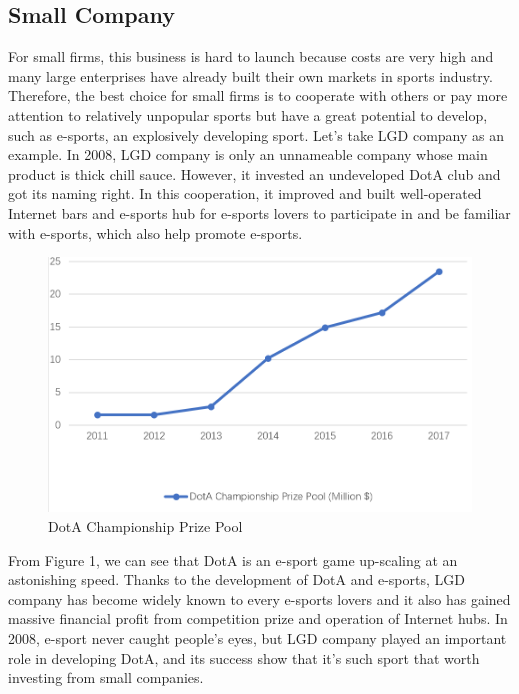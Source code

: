 \documentclass[12pt]{article}
\begin{document}
\subsection{Small Company}
For small firms, this business is hard to launch because costs are very high and many large enterprises have already built their own markets in sports industry. Therefore, the best choice for small firms is to cooperate with others or pay more attention to relatively unpopular sports but have a great potential to develop, such as e-sports, an explosively developing sport. Let's take LGD company as an example. In 2008, LGD company is only an unnameable company whose main product is thick chill sauce. However, it invested an undeveloped DotA club and got its naming right. In this cooperation, it improved and built well-operated Internet bars and e-sports hub for e-sports lovers to participate in and be familiar with e-sports, which also help promote e-sports.
\begin{figure}[H]
\centering
\includegraphics[scale=0.4]{P1.jpg}
\caption{DotA Championship Prize Pool}
\end{figure} 
From Figure 1, we can see that DotA is an e-sport game up-scaling at an astonishing speed. Thanks to the development of DotA and e-sports, LGD company has become widely known to every e-sports lovers and it also has gained massive financial profit from competition prize and operation of Internet hubs. In 2008, e-sport never caught people's eyes, but LGD company played an important role in developing DotA, and its success show that it's such sport that worth investing from small companies.
\end{document}
